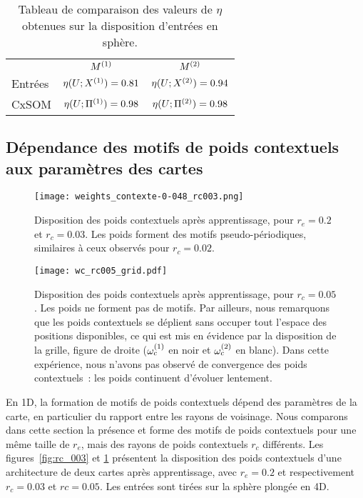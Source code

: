 \documentclass[../main]{subfiles}
\begin{document}
\begin{table}
	\caption{Tableau de comparaison des valeurs de $\eta$ obtenues sur la disposition d'entrées en sphère. \label{tab:eta2D}}
	\centering\begin{tabular}{lcc}
						&$M^{({1})}$ 					& $M^{({2})}$ 						\\
		Entrées 		& $\eta(U;X^{({1})}) = 0.81$ & $\eta(U;X^{({2})}) = 0.94$  \\
		CxSOM  	 		& $\eta(U;\Pi^{({1})}) = 0.98$ & $\eta(U;\Pi^{({2})}) = 0.98$ 	\\
	\end{tabular}
\end{table}

\subsection{Dépendance des motifs de poids contextuels aux paramètres des cartes \label{par:params2D}}

\begin{figure}[ht!]
\begin{minipage}{\textwidth}
	\texttt{[image: weights\_contexte-0-048\_rc003.png]}
	\caption{Disposition des poids contextuels après apprentissage, pour $r_e = 0.2$ et $r_c = 0.03$. Les poids forment des motifs pseudo-périodiques, similaires à ceux observés pour $r_c = 0.02$. \label{fig:rc_003}}
\end{minipage}

\begin{minipage}{\textwidth}
	\texttt{[image: wc\_rc005\_grid.pdf]}
	\caption{Disposition des poids contextuels après apprentissage, pour $r_c =0.05$. Les poids ne forment pas de motifs. Par ailleurs, nous remarquons que les poids contextuels se déplient sans occuper tout l'espace des positions disponibles, ce qui est mis en évidence par la disposition de la grille, figure de droite ($\omega_c^{({1})}$ en noir et $\omega_c^{({2})}$ en blanc).
	Dans cette expérience, nous n'avons pas observé de convergence des poids contextuels~: les poids continuent d'évoluer lentement.
	\label{fig:rc_005}}
\end{minipage}
\end{figure}

En 1D, la formation de motifs de poids contextuels dépend des paramètres de la carte, en particulier du rapport entre les rayons de voisinage.
Nous comparons dans cette section la présence et forme des motifs de poids contextuels pour une même taille de $r_e$, mais des rayons de poids contextuels $r_c$ différents.
Les figures~\ref{fig:rc_003} et \ref{fig:rc_005} présentent la disposition des poids contextuels d'une architecture de deux cartes après apprentissage, avec $r_e = 0.2$ et respectivement $r_c = 0.03$ et $rc = 0.05$. Les entrées sont tirées sur la sphère plongée en 4D.
\end{document}
